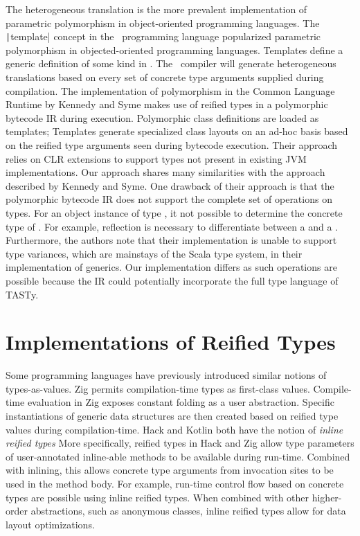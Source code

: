 The heterogeneous translation is the more prevalent implementation of parametric polymorphism in object-oriented programming languages.
The \texttt|template| concept in the \CC\ programming language popularized parametric polymorphism in objected-oriented programming languages.
Templates define a generic definition of some kind in \CC.
The \CC\ compiler will generate heterogeneous translations based on every set of concrete type arguments supplied during compilation.
The implementation of polymorphism in the Common Language Runtime\cite{clr:overview,clr:spec} by Kennedy and Syme makes use of reified types in a polymorphic bytecode IR during execution.
Polymorphic class definitions are loaded as templates; Templates generate specialized class layouts on an ad-hoc basis based on the reified type arguments seen during bytecode execution.
Their approach relies on CLR extensions to support types not present in existing JVM implementations.
Our approach shares many similarities with the approach described by Kennedy and Syme.
One drawback of their approach is that the polymorphic bytecode IR does not support the complete set of operations on types.
For an object instance of type , it not possible to determine the concrete type of .
For example, reflection is necessary to differentiate between a  and a .
Furthermore, the authors note that their implementation is unable to support type variances, which are mainstays of the Scala type system, in their implementation of generics.
Our implementation differs as such operations are possible because the IR could potentially incorporate the full type language of TASTy.

\section{Implementations of Reified Types}

Some programming languages have previously introduced similar notions of types-as-values.
Zig\cite{zig} permits compilation-time types as first-class values. 
Compile-time evaluation in Zig exposes constant folding as a user abstraction.
Specific instantiations of generic data structures are then created based on reified type values during compilation-time.
Hack\cite{hack:inline-reified-types} and Kotlin\cite{kotlin:inline-functions} both have the notion of \textit{inline reified types}
More specifically, reified types in Hack and Zig allow type parameters of user-annotated inline-able methods to be available during run-time. 
Combined with inlining, this allows concrete type arguments from invocation sites to be used in the method body.
For example, run-time control flow based on concrete types are possible using inline reified types.
When combined with other higher-order abstractions, such as anonymous classes, inline reified types allow for data layout optimizations.

